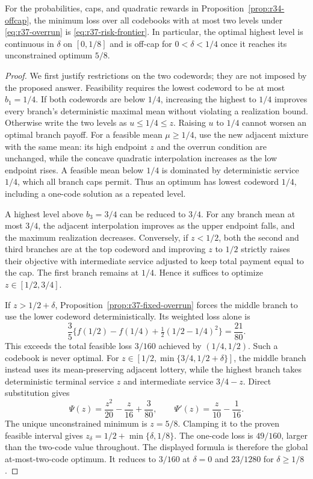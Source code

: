 \begin{proposition}\label{prop:r37-overrun-example}
For the probabilities, caps, and quadratic rewards in Proposition~\ref{prop:r34-offcap}, the minimum loss over all codebooks with at most two levels under \eqref{eq:r37-overrun} is \eqref{eq:r37-risk-frontier}. In particular, the optimal highest level is continuous in $\delta$ on $[0,1/8]$ and is off-cap for $0<\delta<1/4$ once it reaches its unconstrained optimum $5/8$.
\end{proposition}
\begin{proof}
We first justify restrictions on the two codewords; they are not imposed by the proposed answer. Feasibility requires the lowest codeword to be at most $b_1=1/4$. If both codewords are below $1/4$, increasing the highest to $1/4$ improves every branch's deterministic maximal mean without violating a realization bound. Otherwise write the two levels as $u\leq1/4\leq z$. Raising $u$ to $1/4$ cannot worsen an optimal branch payoff. For a feasible mean $\mu\geq1/4$, use the new adjacent mixture with the same mean: its high endpoint $z$ and the overrun condition are unchanged, while the concave quadratic interpolation increases as the low endpoint rises. A feasible mean below $1/4$ is dominated by deterministic service $1/4$, which all branch caps permit. Thus an optimum has lowest codeword $1/4$, including a one-code solution as a repeated level.

A highest level above $b_3=3/4$ can be reduced to $3/4$. For any branch mean at most $3/4$, the adjacent interpolation improves as the upper endpoint falls, and the maximum realization decreases. Conversely, if $z<1/2$, both the second and third branches are at the top codeword and improving $z$ to $1/2$ strictly raises their objective with intermediate service adjusted to keep total payment equal to the cap. The first branch remains at $1/4$. Hence it suffices to optimize $z\in[1/2,3/4]$.

If $z>1/2+\delta$, Proposition~\ref{prop:r37-fixed-overrun} forces the middle branch to use the lower codeword deterministically. Its weighted loss alone is
\[
 \frac35\{f(1/2)-f(1/4)+\tfrac12(1/2-1/4)^2\}
 =\frac{21}{80}.
\]
This exceeds the total feasible loss $3/160$ achieved by $(1/4,1/2)$. Such a codebook is never optimal. For $z\in[1/2,\min\{3/4,1/2+\delta\}]$, the middle branch instead uses its mean-preserving adjacent lottery, while the highest branch takes deterministic terminal service $z$ and intermediate service $3/4-z$. Direct substitution gives
\[
 \Psi(z)=\frac{z^2}{20}-\frac z{16}+\frac3{80},\qquad
 \Psi'(z)=\frac z{10}-\frac1{16}.
\]
The unique unconstrained minimum is $z=5/8$. Clamping it to the proven feasible interval gives $z_\delta=1/2+\min\{\delta,1/8\}$. The one-code loss is $49/160$, larger than the two-code value throughout. The displayed formula is therefore the global at-most-two-code optimum. It reduces to $3/160$ at $\delta=0$ and $23/1280$ for $\delta\geq1/8$.
\end{proof}

